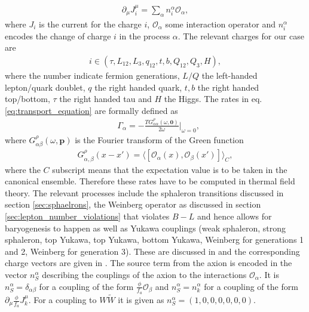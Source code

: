 \documentclass[13pt,a4paper,titlepage]{article}
\begin{document}
\begin{align}
    \partial_\mu J^\mu_i = \sum_\alpha n^\alpha_i \mathcal{O}_\alpha,
\end{align}
where $J_i$ is the current for the charge $i$, $\mathcal{O}_\alpha$ some interaction operator and
$n^\alpha_i$ encodes the change of charge $i$ in the process $\alpha$.
The relevant charges for our case are \cite[eq. 5.6]{Domcke:2020kcp_Generic_Couplings}
\begin{align}
i \in (\tau, L_{12}, L_3, q_{12}, t, b, Q_{12}, Q_3, H),
\end{align}
where the number indicate fermion generations, $L/Q$ the left-handed lepton/quark doublet, $q$ the right handed quark, $t,b$ the right handed top/bottom, $\tau$ the right handed tau and $H$ the Higgs.
The rates in eq. \eqref{eq:transport_equation} are formally defined as \cite[eq. B.18]{Domcke:2020kcp_Generic_Couplings}
\begin{align}
    &\Gamma_\alpha = - \frac{T G_{\alpha \alpha}^\rho(\omega, \mathbf{0})}{2\omega} \Big|_{\omega = 0},
\end{align}
where $G_{\alpha \beta}^\rho(\omega, \mathbf{p})$ is the Fourier transform of the Green function \cite[eq. B.16]{Domcke:2020kcp_Generic_Couplings}
\begin{align}
    G^\rho_{\alpha, \beta}(x - x') = \langle [\mathcal{O}_\alpha(x), \mathcal{O}_\beta(x')] \rangle_C,
\end{align}
where the $C$ subscript means that the expectation value is to be taken in the canonical ensemble.
Therefore these rates have to be computed in thermal field theory.
The relevant processes include the sphaleron transitions discussed in section \ref{sec:sphaelrons},
the Weinberg operator as discussed in section \ref{sec:lepton_number_violations} that violates $B - L$ and hence allows for baryogenesis to happen as well as
Yukawa couplings (weak sphaleron, strong sphaleron, top Yukawa, top Yukawa, bottom Yukawa, Weinberg for generations 1 and 2, Weinberg for generation 3).
These are discussed in \cite[sec. 3.1]{Domcke:2020kcp_Generic_Couplings} and the corresponding charge vectors are given in \cite[eq. 5.7]{Domcke:2020kcp_Generic_Couplings}.
The source term from the axion is encoded in the vector $n_S^\alpha$ describing the couplings of
the axion to the interactions $\mathcal{O}_\alpha$. It is $n_S^\alpha = \delta_{\alpha \beta}$ for a coupling of the form $\frac{\phi}{f_a} \mathcal{O}_\beta$
and $n_S^\alpha = n_k^\alpha$ for a coupling of the form $\partial_\mu \frac{\phi}{f_a} J^\mu_k$.
For a coupling to $W \tilde{W}$ it is given as $n_S^\alpha = (1, 0, 0, 0, 0, 0, 0)$.
\end{document}
